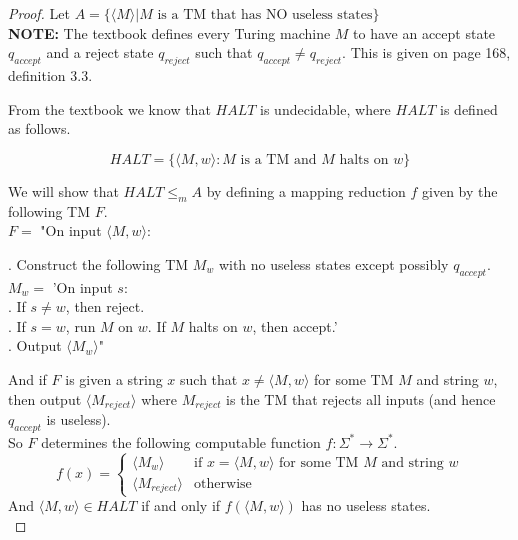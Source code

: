 \documentclass[12pt]{article}
\begin{document}
\begin{proof}
Let $A = \{\langle M \rangle | \text{$M$ is a TM that has NO useless states}\}$ \\

\textbf{NOTE:} The textbook defines every Turing machine $M$ to have an accept state $q_{accept}$ and a reject state $q_{reject}$ such that $q_{accept} \neq q_{reject}$. This is given on page 168, definition 3.3. 

From the textbook we know that $HALT$ is undecidable, where $HALT$ is defined as follows. 

$$HALT = \{\langle M, w \rangle : \text{$M$ is a TM and $M$ halts on $w$}\}$$

We will show that $HALT \leq_m A$ by defining a mapping reduction $f$ given by the following TM $F$. \\

$F = $ "On input $\langle M, w \rangle$: \\

\setlength\parindent{15pt}

. Construct the following TM $M_w$ with no useless states except possibly $q_{accept}$. \\
\indent \indent $M_w = $ 'On input $s$: \\
\indent \indent {}. If $s \neq w$, then reject. \\
\indent \indent {}. If $s = w$, run $M$ on $w$. If $M$ halts on $w$, then accept.' \\

. Output $\langle M_w \rangle$" \\

\setlength\parindent{0pt}

And if $F$ is given a string $x$ such that $x \neq \langle M, w \rangle$ for some TM $M$ and string $w$, then output $\langle M_{reject} \rangle$ where $M_{reject}$ is the TM that rejects all inputs (and hence $q_{accept}$ is useless). \\

So $F$ determines the following computable function $f: \Sigma^* \rightarrow \Sigma^*$. 
\[
  f(x) =
  \begin{cases}
        \langle M_w \rangle & \text{if $x = \langle M, w \rangle$ for some TM $M$ and string $w$} \\
        \langle M_{reject} \rangle & \text{otherwise} 
  \end{cases}
\]
And $\langle M, w \rangle \in HALT$ if and only if $f(\langle M, w \rangle)$ has no useless states. \\


\end{proof}
\end{document}
